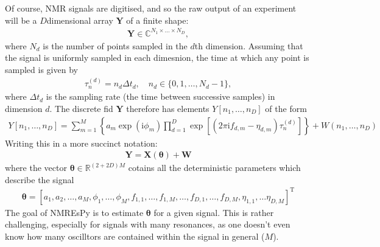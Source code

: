 \documentclass[letterpaper,10pt,english]{sphinxmanual}
\begin{document}
\sphinxAtStartPar
Of course, NMR signals are digitised, and so the raw output of an experiment
will be a \(D\)\sphinxhyphen{}dimensional array \(\boldsymbol{Y}\) of a finite
shape:
\begin{equation*}
\begin{split}\boldsymbol{Y} \in \mathbb{C}^{N_1 \times \dots \times N_D},\end{split}
\end{equation*}
\sphinxAtStartPar
where \(N_d\) is the number of points sampled in the \(d\)\sphinxhyphen{}th
dimension. Assuming that the signal is uniformly sampled in each dimesnion,
the time at which any point is sampled is given by
\begin{equation*}
\begin{split}\tau_{n}^{(d)} = n_d \Delta t_d, \quad n_d \in \{0, 1, \dots, N_d - 1\},\end{split}
\end{equation*}
\sphinxAtStartPar
where \(\Delta t_d\) is the sampling rate (the time between successive
samples) in dimension \(d\). The discrete fid \(\boldsymbol{Y}\)
therefore has elements \(Y\left[n_1, \dots, n_D\right]\) of the form
\begin{equation*}
\begin{split}Y\left[n_1, \dots, n_D\right] = \sum_{m=1}^{M} \left\lbrace a_m
\exp\left(\mathrm{i} \phi_m\right) \prod_{d=1}^{D} \exp\left[\left(2 \pi
\mathrm{i} f_{d,m} - \eta_{d,m}\right) \tau_n^{(d)}\right]\right\rbrace
+ W(n_1, \dots, n_D)\end{split}
\end{equation*}
\sphinxAtStartPar
Writing this in a more succinct notation:
\begin{equation*}
\begin{split}\boldsymbol{Y} = \boldsymbol{X}\left(\boldsymbol{\theta}\right) +
\boldsymbol{W}\end{split}
\end{equation*}
\sphinxAtStartPar
where the vector \(\boldsymbol{\theta} \in \mathbb{R}^{(2+2D)M}\) cotains
all the deterministic parameters which describe the signal
\begin{equation*}
\begin{split}\boldsymbol{\theta} = \left[a_1, a_2, \dots, a_M, \phi_1, \dots, \phi_M,
f_{1,1}, \dots, f_{1,M}, \dots, f_{D,1}, \dots, f_{D,M}, \eta_{1,1}, \dots
\eta_{D,M}\right]^{\mathrm{T}}\end{split}
\end{equation*}
\sphinxAtStartPar
The goal of NMR\sphinxhyphen{}EsPy is to estimate \(\boldsymbol{\theta}\) for a given
signal. This is rather challenging, especially for signals with many resonances,
as one doesn’t even know how many oscilltors are contained within the signal in
general (\(M\)).
\end{document}
